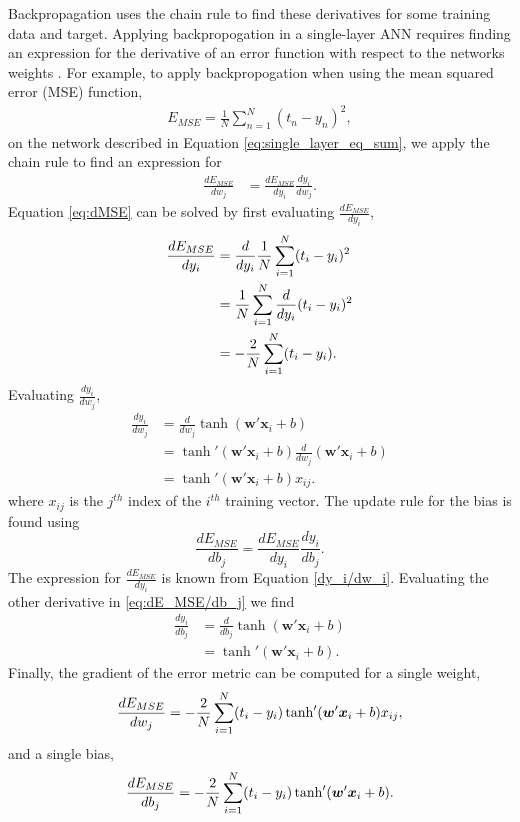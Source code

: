 Backpropagation uses the chain rule to find these derivatives for some training data and target. Applying backpropogation in a single-layer ANN requires finding an expression for the derivative of an error function with respect to the networks weights \cite{Nielsen2015}. For example, to apply backpropogation when using the mean squared error (MSE) function,
%
\begin{align} \label{eq:MSE_error}
E_{MSE} = {\frac{1} N} \sum_{n=1}^N (t_n - y_n)^2,
\end{align}
%
on the network described in Equation \ref{eq:single_layer_eq_sum}, we apply the chain rule to find an expression for
%
\begin{align} \label{eq:dMSE}
\frac{dE_{MSE}}{dw_j} &= \frac{dE_{MSE}}{dy_i} \frac{dy_i}{dw_j}.
\end{align}
%
Equation \ref{eq:dMSE} can be solved by first evaluating $\frac{dE_{MSE}}{dy_i}$,
%
\begin{align} \label{dE_{MSE}/dy_i}
\frac{dE_{MSE}}{dy_i}  &= \frac{d}{dy_i} \frac{1}{N} \sum_{i=1}^N(t_i - y_i)^2 \\
&= \frac{1}{N} \sum_{i=1}^N  \frac{d}{dy_i} (t_i - y_i)^2 \nonumber \\
&=  -\frac{2}{N} \sum_{i=1}^N  (t_i - y_i). \nonumber
\end{align}
%
Evaluating $\frac{dy_i}{dw_j}$,
%
\begin{align} \label{dy_i/dw_i}
\frac{dy_i}{dw_j}  &= \frac{d}{dw_j} \tanh( \boldsymbol{w}' \boldsymbol{x}_i + b) \\
&= \tanh'( \boldsymbol{w}' \boldsymbol{x}_i + b) \frac{d}{dw_j}( \boldsymbol{w}' \boldsymbol{x}_i + b) \nonumber \\
&= \tanh'( \boldsymbol{w}' \boldsymbol{x}_i + b)  x_{ij}. \nonumber
\end{align}
%
\noindent where $x_{ij}$ is the $j^{th}$ index of the $i^{th}$ training vector.
%
The update rule for the bias is found using
%
\begin{equation} \label{eq:dE_MSE/db_j}
\frac{dE_{MSE}}{db_j} = \frac{dE_{MSE}}{dy_i} \frac{dy_i}{db_j}.
\end{equation}
%
The expression for $\frac{dE_{MSE}}{dy_i}$ is known from Equation \ref{dy_i/dw_i}. Evaluating the other derivative in \ref{eq:dE_MSE/db_j} we find
%
\begin{align}
\frac{dy_i}{db_j} &= \frac{d}{db_j} \tanh(\boldsymbol{w}'\boldsymbol{x}_i + b) \\
 &= \tanh'( \boldsymbol{w}' \boldsymbol{x}_i + b). \nonumber
\end{align}
Finally, the gradient of the error metric can be computed for a single weight, 
%
\begin{equation} \label{eq:dE_{MSE}/dw_j_final}
\frac{dE_{MSE}}{dw_j} =  -\frac{2}{N} \sum_{i=1}^N  (t_i - y_i) \tanh'( \boldsymbol{w}' \boldsymbol{x}_i + b)  x_{ij},
\end{equation}
%
and a single bias,
%
\begin{equation} \label{eq:dE_{MSE}/db_j_final}
\frac{dE_{MSE}}{db_j} =  -\frac{2}{N} \sum_{i=1}^N  (t_i - y_i) \tanh'( \boldsymbol{w}' \boldsymbol{x}_i + b).
\end{equation}


